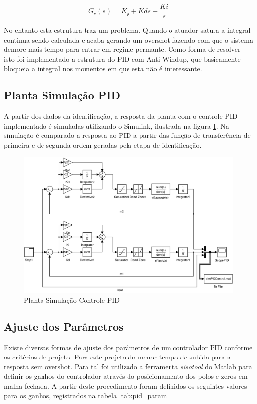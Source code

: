 \documentclass[a4paper,11pt]{article}
\begin{document}
\begin{equation}
    G_c(s) = K_p + Kd s + \frac{Ki}{s}
\end{equation}

No entanto esta estrutura traz um problema. Quando o atuador satura a integral continua sendo calculada e acaba gerando um overshot fazendo com que o sistema demore mais tempo para entrar em regime permante. Como forma de resolver isto foi implementado a estrutura do PID com Anti Windup, que basicamente bloqueia a integral nos momentos em que esta não é interessante.

\subsection{Planta Simulação PID}

A partir dos dados da identificação, a resposta da planta com o controle PID implementado é simuladas utilizando o Simulink, ilustrada na figura \ref{fig:pidControlPlant}. Na simulação é comparado a resposta ao PID a partir das função de transferência de primeira e de segunda ordem geradas pela etapa de identificação.

\begin{figure}[H]
    \centering
    \includegraphics[width=1.0\linewidth]{tex/img/dcMotorControl.pdf}
    \caption{Planta Simulação Controle PID}
    \label{fig:pidControlPlant}
\end{figure}

\subsection{Ajuste dos Parâmetros}

Existe diversas formas de ajuste dos parâmetros de um controlador PID conforme os critérios de projeto. Para este projeto do menor tempo de subida para a resposta sem overshot. Para tal foi utilizado a ferramenta \textit{sisotool} do Matlab para definir os ganhos do controlador através do posicionamento dos polos e zeros em malha fechada. A partir deste procedimento foram definidos os seguintes valores para os ganhos, registrados na tabela \ref{tab:pid_param}
\end{document}
